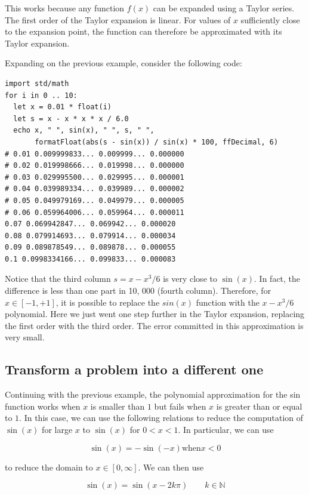 \documentclass[justified, sixbynine]{tufte-book}
\theoremstyle{plain}%
\newtheorem * {corollary}{Corollary}
\theoremstyle{definition}
\theoremstyle{remark}
\newtheorem * {remark}{Remark}
\newtheorem * {note}{Note}
\begin{document}
\begin{fullwidth}
This works because any function $f(x)$ can be expanded using a Taylor series. The first order of the Taylor expansion is linear. For values of $x$ sufficiently close to the expansion point, the function can therefore be approximated with its Taylor expansion.

Expanding on the previous example, consider the following code:

\begin{lstlisting}
import std/math
for i in 0 .. 10:
  let x = 0.01 * float(i)
  let s = x - x * x * x / 6.0
  echo x, " ", sin(x), " ", s, " ",
       formatFloat(abs(s - sin(x)) / sin(x) * 100, ffDecimal, 6)
# 0.01 0.009999833... 0.009999... 0.000000
# 0.02 0.019998666... 0.019998... 0.000000
# 0.03 0.029995500... 0.029995... 0.000001
# 0.04 0.039989334... 0.039989... 0.000002
# 0.05 0.049979169... 0.049979... 0.000005
# 0.06 0.059964006... 0.059964... 0.000011
0.07 0.069942847... 0.069942... 0.000020
0.08 0.079914693... 0.079914... 0.000034
0.09 0.089878549... 0.089878... 0.000055
0.1 0.0998334166... 0.099833... 0.000083
\end{lstlisting}

Notice that the third column $s = x - x^3/6$ is very close to $\sin(x)$. In fact, the difference is less than one part in 10, 000 (fourth column). Therefore, for $x \in [-1, +1]$, it is possible to replace the $sin(x)$ function with the $x-x^3/6$ polynomial. Here we just went one step further in the Taylor expansion, replacing the first order with the third order. The error committed in this approximation is very small.

\goodbreak\subsection{Transform a problem into a different one}

Continuing with the previous example, the polynomial approximation for the sin function works when $x$ is smaller than $1$ but fails when $x$ is greater than or equal to $1$. In this case, we can use the following relations to reduce the computation of $\sin(x)$ for large $x$ to $\sin(x)$ for $0<x<1$. In particular, we can use

\begin{equation}
\sin(x) = -\sin(-x) \textrm{when} x < 0
\end{equation}

to reduce the domain to $x \in [0, \infty]$. We can then use

\begin{equation}
\sin(x) = \sin(x - 2k\pi) \qquad k\in \mathbb{N}
\end{equation}


\end{fullwidth}
\end{document}

